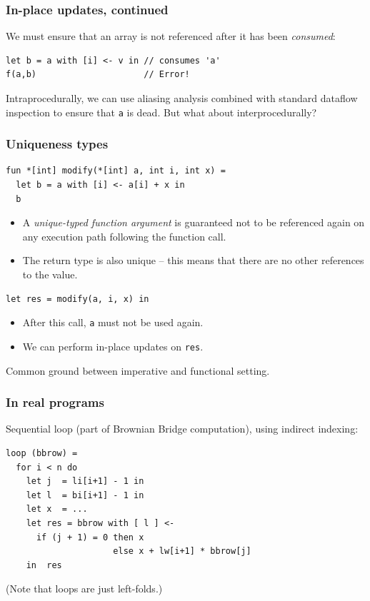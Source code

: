 \documentclass{beamer}
\begin{document}
\begin{frame}[fragile]
  \frametitle{In-place updates, continued}

  We must ensure that an array is not referenced after it has been
  \textit{consumed}:

\begin{lstlisting}
let b = a with [i] <- v in // consumes 'a'
f(a,b)                     // Error!
\end{lstlisting}

  Intraprocedurally, we can use aliasing analysis combined with standard
  dataflow inspection to ensure that \texttt{a} is dead.  But what about
  interprocedurally?

\end{frame}

\begin{frame}[fragile]
  \frametitle{Uniqueness types}

\begin{lstlisting}
fun *[int] modify(*[int] a, int i, int x) =
  let b = a with [i] <- a[i] + x in
  b
\end{lstlisting}

  \begin{itemize}
  \item A \textit{unique-typed function argument} is guaranteed not to
    be referenced again on any execution path following the function
    call.

  \item The return type is also unique -- this means that there are no
    other references to the value.
  \end{itemize}
  \pause
\begin{lstlisting}
let res = modify(a, i, x) in
\end{lstlisting}

  \begin{itemize}
  \item After this call, \texttt{a} must not be
    used again.
  \item We can perform in-place updates on \texttt{res}.
  \end{itemize}

  Common ground between imperative and functional setting.

\end{frame}

\begin{frame}[fragile]
  \frametitle{In real programs}

  Sequential loop (part of Brownian Bridge computation), using
  indirect indexing:

\begin{lstlisting}
loop (bbrow) =
  for i < n do
    let j  = li[i+1] - 1 in
    let l  = bi[i+1] - 1 in
    let x  = ...
    let res = bbrow with [ l ] <-
      if (j + 1) = 0 then x
                     else x + lw[i+1] * bbrow[j]
    in  res
\end{lstlisting}

  (Note that loops are just left-folds.)
\end{frame}
\end{document}
